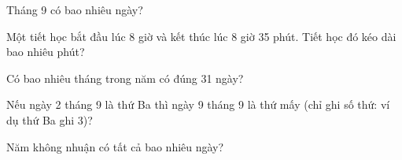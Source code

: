 \begin{ex} %
Tháng 9 có bao nhiêu ngày?
\end{ex}

\begin{ex} %
Một tiết học bắt đầu lúc 8 giờ và kết thúc lúc 8 giờ 35 phút. Tiết học đó kéo dài bao nhiêu phút?
\end{ex}

\begin{ex} %
Có bao nhiêu tháng trong năm có đúng 31 ngày?
\end{ex}

\begin{ex} %
Nếu ngày 2 tháng 9 là thứ Ba thì ngày 9 tháng 9 là thứ mấy (chỉ ghi số thứ: ví dụ thứ Ba ghi 3)?
\end{ex}

\begin{ex} %
Năm không nhuận có tất cả bao nhiêu ngày?
\end{ex}

